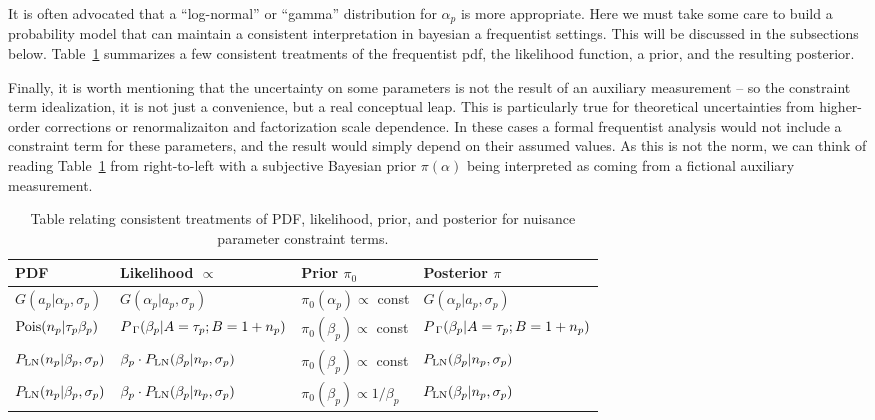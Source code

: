 It is often advocated that a ``log-normal'' or ``gamma'' distribution for $\alpha_p$ is more appropriate.    Here we must take some care to build a probability model that can maintain a consistent interpretation in bayesian a frequentist settings.  This will be discussed in the subsections below.  Table~\ref{tab:constraints} summarizes a few consistent treatments of the frequentist pdf, the likelihood function, a prior, and the resulting posterior.

Finally, it is worth mentioning that the uncertainty on some parameters is not the result of an auxiliary measurement -- so the constraint term idealization, it is not just a convenience, but a real  conceptual leap.  This is particularly true for theoretical uncertainties from higher-order corrections or renormalizaiton and factorization scale dependence.  In these cases a formal frequentist analysis would not include a constraint term for these parameters, and the result would simply depend on their assumed values.  As this is not the norm, we can think of reading Table~\ref{tab:constraints} from right-to-left with a subjective Bayesian prior $\pi(\alpha)$ being interpreted as coming from a fictional auxiliary measurement.


\begin{table}[*htb]
\center
\begin{tabular}{llll}
PDF & Likelihood $\propto$ & Prior $\pi_0$ & Posterior $\pi$ \\ \hline
$G(a_p | \alpha_p, \sigma_p)$ & $G(\alpha_p | a_p, \sigma_p)$ & $\pi_0(\alpha_p)\propto$  const & $G(\alpha_p | a_p, \sigma_p)$ \\
${\rm Pois}(n_p | \tau_p \beta_p)$ & ${P_{\;\Gamma}}(\beta_p | A=\tau_p; B=1+n_p)$ & $\pi_0(\beta_p) \propto$  const & ${P_{\;\Gamma}}(\beta_p | A=\tau_p; B=1+n_p)$ \\
${P_{\rm LN}}(n_p | \beta_p, \sigma_p)$ & $ \beta_p  \cdot {\ensuremath{P_{\rm LN}}}(\beta_p | n_p, \sigma_p)$ & $\pi_0(\beta_p) \propto $ const & ${P_{\rm LN}}(\beta_p | n_p, \sigma_p)$ \\
${P_{\rm LN}}(n_p | \beta_p, \sigma_p)$ & $\beta_p  \cdot{\ensuremath{P_{\rm LN}}}(\beta_p | n_p, \sigma_p)$ & $\pi_0(\beta_p) \propto 1/\beta_p $  & ${P_{\rm LN}}(\beta_p | n_p, \sigma_p)$\\
\end{tabular}
\caption{Table relating consistent treatments of PDF, likelihood, prior, and posterior for nuisance parameter constraint terms.}
\label{tab:constraints}
\end{table}

